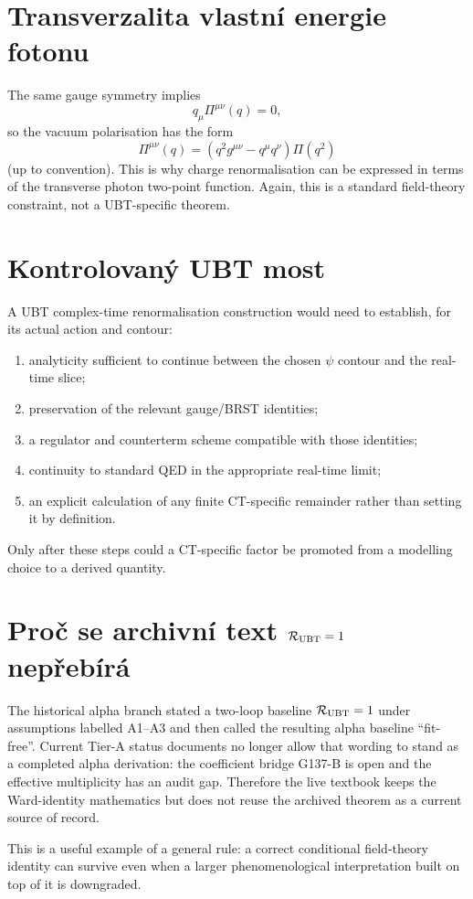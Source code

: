 \section{Transverzalita vlastní energie fotonu}
The same gauge symmetry implies
\[
 q_\mu\Pi^{\mu\nu}(q)=0,
\]
so the vacuum polarisation has the form
\[
 \Pi^{\mu\nu}(q)
 =\left(q^2g^{\mu\nu}-q^\mu q^\nu\right)\Pi(q^2)
\]
(up to convention).  This is why charge renormalisation can be expressed in
terms of the transverse photon two-point function.  Again, this is a standard
field-theory constraint, not a UBT-specific theorem.

\section{Kontrolovaný UBT most}
A UBT complex-time renormalisation construction would need to establish, for
its actual action and contour:
\begin{enumerate}
 \item analyticity sufficient to continue between the chosen $\psi$ contour
       and the real-time slice;
 \item preservation of the relevant gauge/BRST identities;
 \item a regulator and counterterm scheme compatible with those identities;
 \item continuity to standard QED in the appropriate real-time limit;
 \item an explicit calculation of any finite CT-specific remainder rather than
       setting it by definition.
\end{enumerate}
Only after these steps could a CT-specific factor be promoted from a modelling
choice to a derived quantity.

\section{Proč se archivní text \(\mathcal R_{\rm UBT}=1\) nepřebírá}
The historical alpha branch stated a two-loop baseline
\(\mathcal R_{\rm UBT}=1\) under assumptions labelled A1--A3 and then called the
resulting alpha baseline ``fit-free''.  Current Tier-A status documents no
longer allow that wording to stand as a completed alpha derivation: the
coefficient bridge G137-B is open and the effective multiplicity has an audit
gap.  Therefore the live textbook keeps the Ward-identity mathematics but does
not reuse the archived theorem as a current source of record.

This is a useful example of a general rule: a correct conditional field-theory
identity can survive even when a larger phenomenological interpretation built
on top of it is downgraded.

